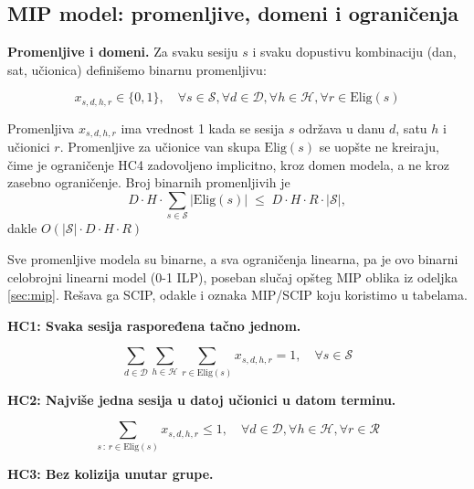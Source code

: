 \documentclass[12pt,oneside]{memoir}
\begin{document}
\subsection{MIP model: promenljive, domeni i ograničenja}
\label{sec:mip_form}

\textbf{Promenljive i domeni.}
Za svaku sesiju $s$ i svaku dopustivu kombinaciju (dan, sat, učionica)
definišemo binarnu promenljivu:

\begin{equation}
x_{s,d,h,r} \in \{0, 1\}, \quad \forall s \in \mathcal{S},
  \forall d \in \mathcal{D}, \forall h \in \mathcal{H},
  \forall r \in \text{Elig}(s)
\label{eq:mip_vars}
\end{equation}

\noindent Promenljiva $x_{s,d,h,r}$ ima vrednost 1 kada se sesija $s$
održava u danu $d$, satu $h$ i učionici $r$. Promenljive za učionice
van skupa $\text{Elig}(s)$ se uopšte ne kreiraju, čime je ograničenje
HC4 zadovoljeno implicitno, kroz domen modela, a ne kroz zasebno
ograničenje. Broj binarnih promenljivih je
\begin{equation}
D \cdot H \cdot \sum_{s \in \mathcal{S}} |\text{Elig}(s)|
\;\leq\; D \cdot H \cdot R \cdot |\mathcal{S}|,
\label{eq:mip_broj_promenljivih}
\end{equation}
dakle $O(|\mathcal{S}| \cdot D \cdot H \cdot R)$

Sve promenljive modela su binarne, a sva ograničenja linearna, pa je
ovo binarni celobrojni linearni model (0-1 ILP), poseban slučaj opšteg
MIP oblika iz odeljka \ref{sec:mip}. Rešava ga SCIP, odakle i oznaka
MIP/SCIP koju koristimo u tabelama.

\medskip
\textbf{HC1: Svaka sesija raspoređena tačno jednom.}

\begin{equation}
\sum_{d \in \mathcal{D}} \sum_{h \in \mathcal{H}}
  \sum_{r \in \text{Elig}(s)} x_{s,d,h,r} = 1,
  \quad \forall s \in \mathcal{S}
\label{eq:mip_hc1}
\end{equation}

\medskip
\textbf{HC2: Najviše jedna sesija u datoj učionici u datom terminu.}

\begin{equation}
\sum_{s \,:\, r \in \text{Elig}(s)} x_{s,d,h,r} \leq 1,
  \quad \forall d \in \mathcal{D}, \forall h \in \mathcal{H},
  \forall r \in \mathcal{R}
\label{eq:mip_hc2}
\end{equation}

\medskip
\textbf{HC3: Bez kolizija unutar grupe.}
\end{document}
